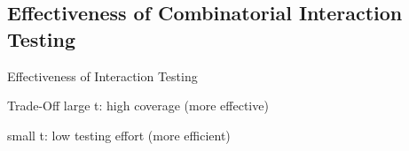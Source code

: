 
\subsection{Effectiveness of Combinatorial Interaction Testing}
\begin{frame}{\myframetitle{}}
	\begin{fancycolumns}
		\begin{exampletight}{Effectiveness of Interaction Testing }
		\end{exampletight}
	\nextcolumn
		\begin{note}{Trade-Off}
			large t: high coverage (more effective)
			
			small t: low testing effort (more efficient)
		\end{note}
	\end{fancycolumns}
\end{frame}
